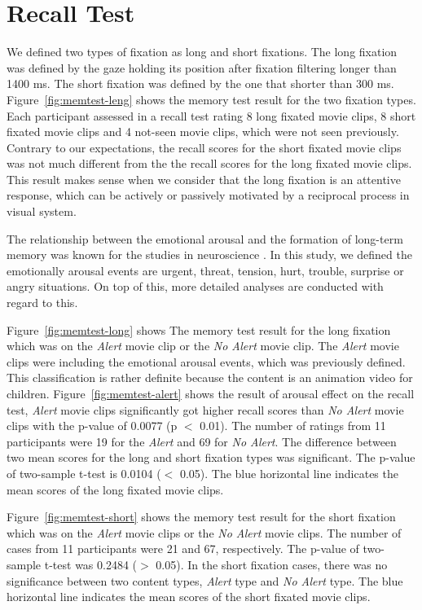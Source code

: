 \documentclass[oneside,master]{snueethesis}
\begin{document}
\section{Recall Test}

We defined two types of fixation as long and short fixations. The long fixation was defined by the gaze holding its position after fixation filtering longer than 1400 ms. The short fixation was defined by the one that shorter than 300 ms. Figure~\ref{fig:memtest-leng} shows the memory test result for the two fixation types. Each participant assessed in a recall test rating 8 long fixated movie clips, 8 short fixated movie clips and 4 not-seen movie clips, which were not seen previously. Contrary to our expectations, the recall scores for the short fixated movie clips was not much different from the the recall scores for the long fixated movie clips. This result makes sense when we consider that the long fixation is an attentive response, which can be actively or passively motivated by a reciprocal process in visual system.

The relationship between the emotional arousal and the formation of long-term memory was known for the studies in neuroscience \cite{Cahill1996amyg,Cahill1998baso}. In this study, we defined the emotionally arousal events are urgent, threat, tension, hurt, trouble, surprise or angry situations. On top of this, more detailed analyses are conducted with regard to this.

Figure~\ref{fig:memtest-long} shows The memory test result for the long fixation which was on the \textit{Alert} movie clip or the \textit{No Alert} movie clip. The \textit{Alert} movie clips were including the emotional arousal events, which was previously defined. This classification is rather definite because the content is an animation video for children. Figure~\ref{fig:memtest-alert} shows the result of arousal effect on the recall test, \textit{Alert} movie clips significantly got higher recall scores than \textit{No Alert} movie clips with the p-value of 0.0077 (p $<$ 0.01). The number of ratings from 11 participants were 19 for the \textit{Alert} and 69 for \textit{No Alert}. The difference between two mean scores for the long and short fixation types was significant. The p-value of two-sample t-test is 0.0104 ($<$ 0.05). The blue horizontal line indicates the mean scores of the long fixated movie clips.

Figure~\ref{fig:memtest-short} shows the memory test result for the short fixation which was on the \textit{Alert} movie clips or the \textit{No Alert} movie clips. The number of cases from 11 participants were 21 and 67, respectively. The p-value of two-sample t-test was 0.2484 ($>$ 0.05). In the short fixation cases, there was no significance between two content types, \textit{Alert} type and \textit{No Alert} type. The blue horizontal line indicates the mean scores of the short fixated movie clips.
\end{document}
